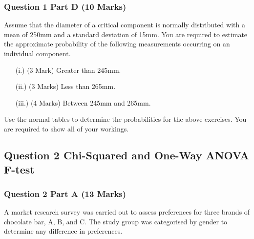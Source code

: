 \documentclass[a4paper,12pt]{article}
\begin{document}
%

\bigskip
\subsubsection*{Question 1 Part D (10 Marks)}
Assume that the diameter of a critical component is normally distributed with a mean of 250mm and a standard deviation of 15mm. You are required  to estimate the approximate probability of the following measurements occurring on an individual component.
\begin{itemize}
	\item[(i.)](3 Mark) Greater than 245mm.
	\item[(ii.)](3 Marks) Less than 265mm.
	\item [(iii.)](4 Marks) Between 245mm and 265mm.
\end{itemize}
\bigskip
\noindent Use the normal tables to determine the probabilities for the above exercises. You are required to show all of your workings.


	\newpage
\subsection*{Question 2 Chi-Squared and One-Way ANOVA F-test}
\subsubsection*{Question 2 Part A (13 Marks)}

A market research survey was carried out to assess preferences for three brands of chocolate bar, A, B, and C. 
The study group was categorised by gender to determine any difference in preferences.
\end{document}

